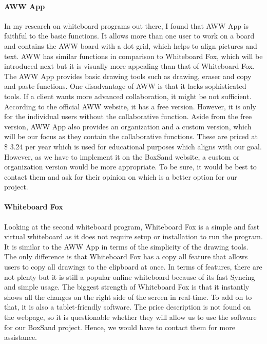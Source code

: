\documentclass[10pt]{article}
\begin{document}
            \paragraph{AWW App}
                In my research on whiteboard programs out there, I found that AWW App is faithful to the basic functions. It allows more than one user to work on a board and contains the AWW board with a dot grid, which helps to align pictures and text. AWW has similar functions in comparison to Whiteboard Fox, which will be introduced next but it is visually more appealing than that of Whiteboard Fox. The AWW App provides basic drawing tools such as drawing, eraser and copy and paste functions. One disadvantage of AWW is that it lacks sophisticated tools. If a client wants more advanced collaboration, it might be not sufficient. According to the official AWW website, it has a free version. However, it is only for the individual users without the collaborative function. Aside from the free version, AWW App also provides an organization and a custom version, which will be our focus as they contain the collaborative functions. These are priced at \$ 3.24 per year which is used for educational purposes which aligns with our goal. However, as we have to implement it on the BoxSand website, a custom or organization version would be more appropriate. To be sure, it would be best to contact them and ask for their opinion on which is a better option for our project. \cite{AWW APP Price}
                
            \paragraph{Whiteboard Fox}
                Looking at the second whiteboard program, Whiteboard Fox is a simple and fast virtual whiteboard as it does not require setup or installation to run the program. It is similar to the AWW App in terms of the simplicity of the drawing tools. The only difference is that Whiteboard Fox has a copy all feature that allows users to copy all drawings to the clipboard at once. In terms of features, there are not plenty but it is still a popular online whiteboard because of its fast Syncing and simple usage. The biggest strength of Whiteboard Fox is that it instantly shows all the changes on the right side of the screen in real-time. To add on to that, it is also a tablet-friendly software. The price description is not found on the webpage, so it is questionable whether they will allow us to use the software for our BoxSand project. Hence, we would have to contact them for more assistance. 
         
\end{document}
